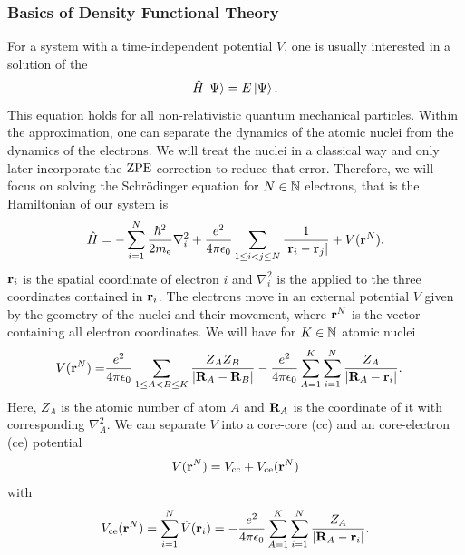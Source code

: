 \subsubsection{Basics of Density Functional Theory}
For a system with a time-independent potential $V$, one is usually interested in
a solution of the 
\begin{equation}
 \hat{H} \left|\Psi{}\right\rangle = E \left|\Psi{}\right\rangle.
 \label{Theo:Schroedinger}
\end{equation}
This equation holds for all non-relativistic quantum mechanical particles.
Within the  approximation, one can separate the dynamics
of the atomic nuclei from the dynamics of the electrons. We will treat the
nuclei in a classical way and only later incorporate the $\text{ZPE}$ correction to reduce
that error. Therefore, we will focus on solving the Schrödinger
equation for $N \in \mathbb{N}$ electrons, that is the Hamiltonian of our system is
\begin{equation}
 \hat{H} = -\sum_{i=1}^N \frac{\hbar^2}{2m_\text e} \nabla_i^2 + \frac {e^2} {4 \pi
 \epsilon_0} \sum_{1\le i < j \le N} \frac 1 {\left|{\mathbf{r}_i - \mathbf{r}_j}\right|} + V(\mathbf{r}^N).
 \label{Theo:Hamiltonian}
\end{equation}
$\mathbf{r}_i$ is the spatial coordinate of electron $i$ and $\nabla_i^2$ is the
 applied to the three coordinates contained in $\mathbf{r}_i$.
The electrons move in an external potential $V$ given by the geometry of the
nuclei and their movement, where $\mathbf{r}^N$ is the vector containing all electron
coordinates.
We will have for $K \in \mathbb{N}$ atomic nuclei
\begin{equation}
\begin{aligned}
V(\mathbf{r}^N)=& \frac {e^2} {4 \pi \epsilon_0} \sum_{1\le A < B \le K} \frac {Z_A Z_B}
{\left|{\mathbf{R}_A - \mathbf{R}_B}\right|} - \frac {e^2} {4 \pi \epsilon_0} \sum_{A=1}^K \sum_{i=1}^N
\frac {Z_A} {\left|{\mathbf{R}_A - \mathbf{r}_i}\right|}.
\end{aligned}
\label{Theo:CorePotential}
\end{equation}
Here, $Z_A$ is the atomic number of atom $A$ and $\mathbf{R}_A$ is the coordinate of
it with corresponding $\nabla_A^2$. We can separate $V$ into a core-core (cc)
and an core-electron (ce) potential \newcommand\vce{V_{\te{ce}}}
\newcommand\vcc{V_{\te{cc}}}
\begin{equation}
 V(\r^N)=\vcc+\vce(\r^N)
\label{Theo:SeparatePotential}
\end{equation}
with
\begin{equation}
 \vce(\r^N)=\sum_{i=1}^N \tilde V(\r_i) = - \frac {e^2} {4 \pi \e_0} \sum_{A=1}^K \sum_{i=1}^N \frac {Z_A} {\abs{\bo R_A - \r_i}}.
 \label{Theo:CoreElectronPotential}
\end{equation}



